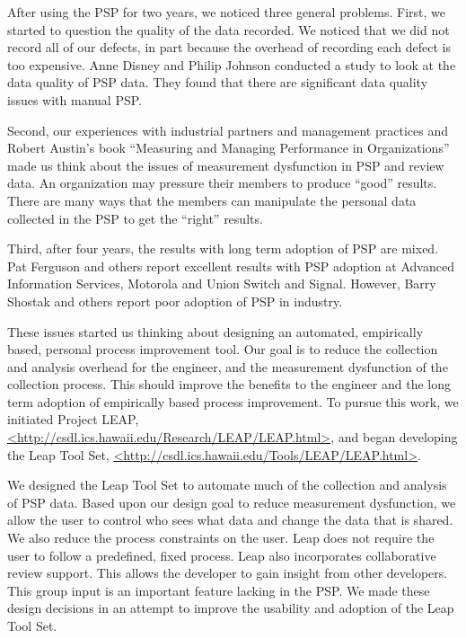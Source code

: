 \documentclass[12pt]{article}
\begin{document}
After using the PSP for two years, we noticed three general problems.  First, we
started to question the quality of the data recorded.  We noticed that we
did not record all of our defects, in part because the overhead of recording
each defect is too expensive.  Anne Disney and Philip Johnson conducted a
study to look at the data quality of PSP data.  They found that there are
significant data quality issues with manual PSP.\cite{Disney98, Disney98a}

Second, our experiences with industrial partners and management practices
and Robert Austin's book ``Measuring and Managing Performance in
Organizations''\cite{Austin96} made us think about the issues of
measurement dysfunction in PSP and review data.  An organization may
pressure their members to produce ``good'' results.  There are many ways
that the members can manipulate the personal data collected in the PSP to
get the ``right'' results.

Third, after four years, the results with long term adoption of PSP are
mixed.  Pat Ferguson and others report excellent results with PSP adoption
at Advanced Information Services, Motorola and Union Switch and
Signal\cite{Ferguson97}.  However, Barry Shostak and others report poor
adoption of PSP in industry\cite{Shostak96,Emam96}.

These issues started us thinking about designing an automated, empirically
based, personal process improvement tool.  Our goal is to reduce the
collection and analysis overhead for the engineer, and the measurement
dysfunction of the collection process.  This should improve the benefits to
the engineer and the long term adoption of empirically based process
improvement.  To pursue this work, we initiated Project LEAP,
\url{<http://csdl.ics.hawaii.edu/Research/LEAP/LEAP.html>}, and began
developing the Leap Tool Set,
\url{<http://csdl.ics.hawaii.edu/Tools/LEAP/LEAP.html>}.

We designed the Leap Tool Set to automate much of the collection and
analysis of PSP data.  Based upon our design goal to reduce measurement
dysfunction, we allow the user to control who sees what data and change the
data that is shared.  We also reduce the process constraints on the user.
Leap does not require the user to follow a predefined, fixed process.  Leap
also incorporates collaborative review support.  This allows the developer
to gain insight from other developers.  This group input is an important
feature lacking in the PSP.  We made these design decisions in an attempt
to improve the usability and adoption of the Leap Tool Set.
\end{document}
